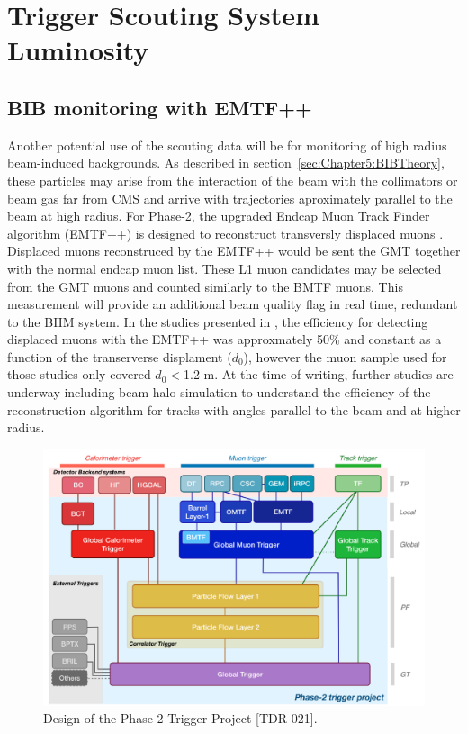 \chapter{Trigger Scouting System Luminosity}


\section{BIB monitoring with EMTF++}

Another potential use of the scouting data will be for monitoring of high radius beam-induced backgrounds.
As described in section~\ref{sec:Chapter5:BIBTheory}, these particles may arise from the interaction of the beam with the collimators or beam gas far from CMS and arrive with trajectories aproximately parallel to the beam at high radius.
For Phase-2, the upgraded Endcap Muon Track Finder algorithm (EMTF++) is designed to reconstruct transversly displaced muons \cite{CERN-LHCC-2020-004}.
Displaced muons reconstruced by the EMTF++ would be sent the GMT together with the normal endcap muon list.
These L1 muon candidates may be selected from the GMT muons and  counted similarly to the BMTF muons.
This measurement will provide an additional beam quality flag in real time, redundant to the BHM system.
In the studies presented in \cite{CERN-LHCC-2020-004}, the efficiency for detecting displaced muons with the EMTF++ was approxmately 50\% and constant as a function of the transerverse displament ($d_0$), however the muon sample used for those studies only covered $d_0<$1.2 m.
At the time of writing, further studies are underway including beam halo simulation to understand the efficiency of the reconstruction algorithm for tracks with angles parallel to the beam and at higher radius.



\begin{figure}[hbtp]
\centering
\includegraphics[width=.7\linewidth]{tex/Part2/fig/Phase2TriggerProject-TDR021-Page8.png}
\caption{
Design of the Phase-2 Trigger Project [TDR-021].
}
\label{fig:Phase2TriggerProject}
\end{figure}

